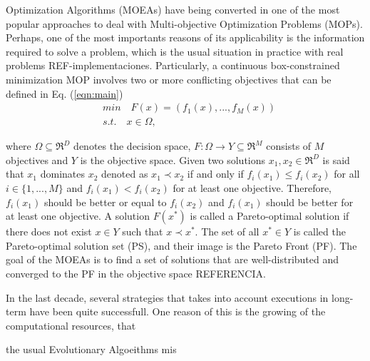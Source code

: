  Optimization Algorithms (MOEAs) have being converted in one of the most popular approaches to deal with Multi-objective Optimization Problems (MOPs).
%
Perhaps, one of the most importants reasons of its applicability is the information required to solve a problem, which is the usual situation in practice with real problems REF-implementaciones.
%
Particularly, a continuous box-constrained minimization MOP involves two or more conflicting objectives that can be defined in Eq. (\ref{eqn:main})
\begin{equation}\label{eqn:main}
\begin{split}
&min \quad F(x) = (f_1(x), ..., f_M(x)) \\
&s.t. \quad x \in \Omega,
\end{split}
\end{equation}

where $\Omega \subseteq \Re^D$ denotes the decision space, $F: \Omega \rightarrow Y \subseteq \Re^M$ consists of $M$ objectives and $Y$ is the objective space.
%
Given two solutions $x_1, x_2 \in \Re^D$ is said that $x_1$ dominates $x_2$ denoted as $x_1 \prec x_2$ if and only if $f_i(x_1) \leq f_i(x_2)$ for all $i \in \{1,...,M\}$ and $f_i(x_1) < f_i(x_2)$ for at least one objective.
%
Therefore, $f_i(x_1)$ should be better or equal to $f_i(x_2)$ and $f_i(x_1)$ should be better for at least one objective.
%
A solution $F(x^*)$ is called a Pareto-optimal solution if there does not exist $x \in Y$ such that $x \prec x^*$.
%
The set of all $x^* \in Y$ is called the Pareto-optimal solution set (PS), and their image is the Pareto Front (PF).
%
The goal of the MOEAs is to find a set of solutions that are well-distributed and converged to the PF in the objective space REFERENCIA.
%

In the last decade, several strategies that takes into account executions in long-term have been quite successfull.
%
One reason of this is the growing of the computational resources, that 

the usual Evolutionary Algoeithms mis







